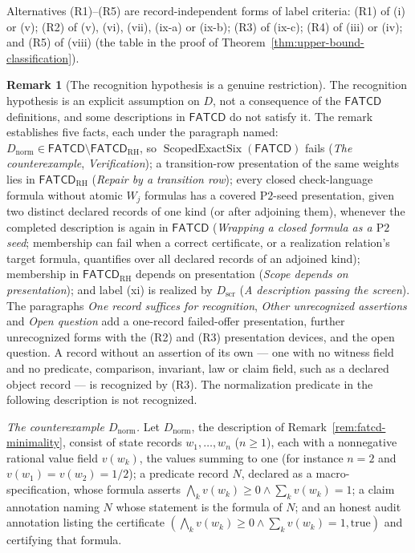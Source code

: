 \documentclass[11pt]{article}
\theoremstyle{definition}
\newtheorem{remark}[theorem]{Remark}
\newcommand{\FATCD}{\ensuremath{\mathsf{FATCD}}}
\newcommand{\ScopedExactSix}[1]{\ensuremath{\operatorname{ScopedExactSix}\!\left(#1\right)}}
\newcommand{\Ptwo}{\ensuremath{\mathrm{P2}}}
\begin{document}
Alternatives (R1)--(R5) are record-independent forms of label criteria: (R1)
of (i) or (v); (R2) of (v), (vi), (vii), (ix-a) or (ix-b); (R3) of (ix-c);
(R4) of (iii) or (iv); and (R5) of (viii) (the table in the proof of
Theorem~\ref{thm:upper-bound-classification}).

\begin{remark}[The recognition hypothesis is a genuine restriction]\label{rem:recognition-open}
The recognition hypothesis is an explicit assumption on \(D\), not a consequence
of the \FATCD{} definitions, and some descriptions in \FATCD{} do not satisfy
it. The remark establishes five facts, each under the paragraph named:
\(D_{\mathrm{norm}}\in\FATCD{}\setminus\FATCD_{\mathrm{RH}}\), so
\(\ScopedExactSix{\FATCD{}}\) fails (\emph{The counterexample},
\emph{Verification}); a transition-row presentation of the same weights lies
in \(\FATCD_{\mathrm{RH}}\) (\emph{Repair by a transition row}); every closed
check-language formula without atomic \(W_j\) formulas has a covered
\Ptwo{}-seed presentation, given two distinct declared records of one kind (or after adjoining them), whenever the completed description is again in \FATCD{} (\emph{Wrapping a closed formula as a \Ptwo{} seed}; membership can fail when a correct certificate, or a realization relation's target formula, quantifies over all declared records of an adjoined kind);
membership in \(\FATCD_{\mathrm{RH}}\) depends on presentation (\emph{Scope
depends on presentation}); and label (xi) is realized by \(D_{\mathrm{scr}}\)
(\emph{A description passing the screen}). The paragraphs \emph{One record suffices for recognition}, \emph{Other unrecognized assertions} and \emph{Open question} add a one-record failed-offer presentation, further unrecognized forms with the (R2) and (R3) presentation devices, and the open question. A record without an assertion of its own --- one with no witness field and
no predicate, comparison, invariant, law or claim field, such as a declared
object record --- is recognized by (R3). The normalization predicate in the
following description is not recognized.
\par\emph{The counterexample \(D_{\mathrm{norm}}\).} Let \(D_{\mathrm{norm}}\), the description of Remark~\ref{rem:fatcd-minimality}, consist of state records \(w_1,\dots,w_n\)
(\(n\ge1\)), each with a nonnegative rational value field \(v(w_k)\), the values
summing to one (for instance \(n=2\) and \(v(w_1)=v(w_2)=1/2\)); a predicate
record \(N\), declared as a macro-specification, whose formula asserts
\(\bigwedge_k v(w_k)\ge0\wedge\sum_k v(w_k)=1\); a claim annotation naming \(N\) whose statement is the
formula of \(N\); and an honest audit annotation listing the certificate
\((\bigwedge_k v(w_k)\ge0\wedge\sum_k v(w_k)=1,\mathrm{true})\) and certifying that formula.


\end{remark}
\end{document}
